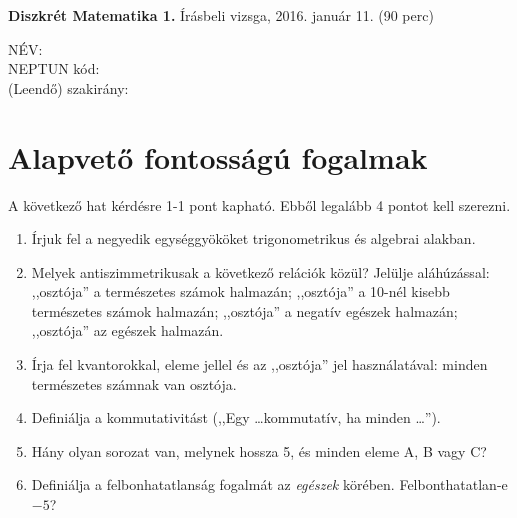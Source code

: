 \documentclass[11pt,a4paper]{article}
\begin{document}
\thispagestyle{empty}

\begin{center}
\begin{large}
\noindent \textbf{Diszkrét Matematika 1.} Írásbeli vizsga, 2016. január 11. (90 perc)
\end{large}
\end{center}

{\noindent NÉV: \\ NEPTUN kód:\\ (Leendő) szakirány:\\}
\section{Alapvető fontosságú fogalmak}
A következő hat kérdésre 1-1 pont kapható. Ebből legalább 4 pontot kell szerezni.
\begin{enumerate}\setlength{\itemsep}{3cm}

\item Írjuk fel a negyedik egységgyököket trigonometrikus és algebrai alakban.

\item Melyek antiszimmetrikusak a következő relációk közül? Jelülje aláhúzással: ,,osztója'' a természetes számok halmazán; ,,osztója'' a 10-nél kisebb természetes számok halmazán; ,,osztója'' a negatív egészek halmazán; ,,osztója'' az egészek halmazán.
\vspace{-2cm}

\item Írja fel kvantorokkal, eleme jellel és az ,,osztója'' jel használatával: minden természetes számnak van osztója.

\item Definiálja a kommutativitást (,,Egy \ldots kommutatív, ha minden \ldots'').

\item Hány olyan sorozat van, melynek hossza 5, és minden eleme A, B vagy C?

\item Definiálja a felbonhatatlanság fogalmát az \emph{egészek} körében. Felbonthatatlan-e $-5$?
\end{enumerate}

\newpage
\end{document}
